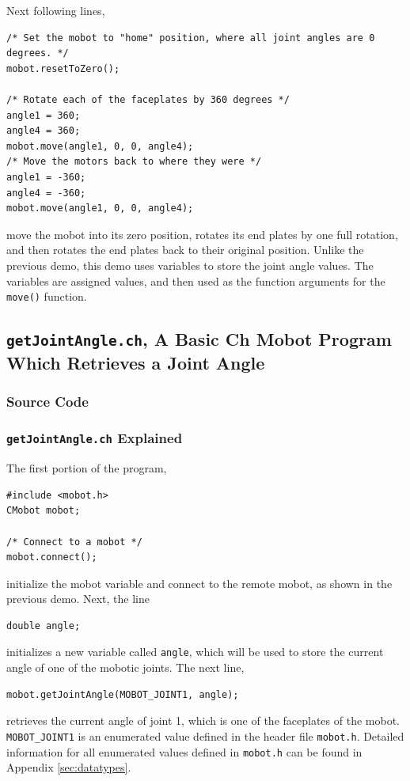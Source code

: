 \documentclass{article}
\begin{document}
Next following lines,
\begin{verbatim}
/* Set the mobot to "home" position, where all joint angles are 0 degrees. */
mobot.resetToZero();

/* Rotate each of the faceplates by 360 degrees */
angle1 = 360;
angle4 = 360;
mobot.move(angle1, 0, 0, angle4);
/* Move the motors back to where they were */
angle1 = -360;
angle4 = -360;
mobot.move(angle1, 0, 0, angle4);
\end{verbatim}
move the mobot into its zero position, rotates its end plates by one full rotation, and then
rotates the end plates back to their original position. Unlike the previous demo, this 
demo uses variables to store the joint angle values. The variables are assigned 
values, and then used as the function arguments for the \texttt{move()} function.

\subsection{\texttt{getJointAngle.ch}, A Basic Ch Mobot Program Which Retrieves a Joint Angle}
\subsubsection{Source Code}


\subsubsection{\texttt{getJointAngle.ch} Explained}
The first portion of the program, 
\begin{verbatim}
#include <mobot.h>
CMobot mobot;

/* Connect to a mobot */
mobot.connect();
\end{verbatim}
initialize the mobot variable and connect to the remote mobot, as shown in the
previous demo. Next, the line
\begin{verbatim}
double angle;
\end{verbatim}
initializes a new variable called \texttt{angle}, which will be used to store
the current angle of one of the mobotic joints. The next line,
\begin{verbatim}
mobot.getJointAngle(MOBOT_JOINT1, angle);
\end{verbatim}
retrieves the current angle of joint 1, which is one of the faceplates of the
mobot. 
\texttt{MOBOT\_JOINT1} is an enumerated value
defined in the header file \texttt{mobot.h}. Detailed information
for all enumerated values defined in \texttt{mobot.h} can be found in 
Appendix \ref{sec:datatypes}.
\end{document}
